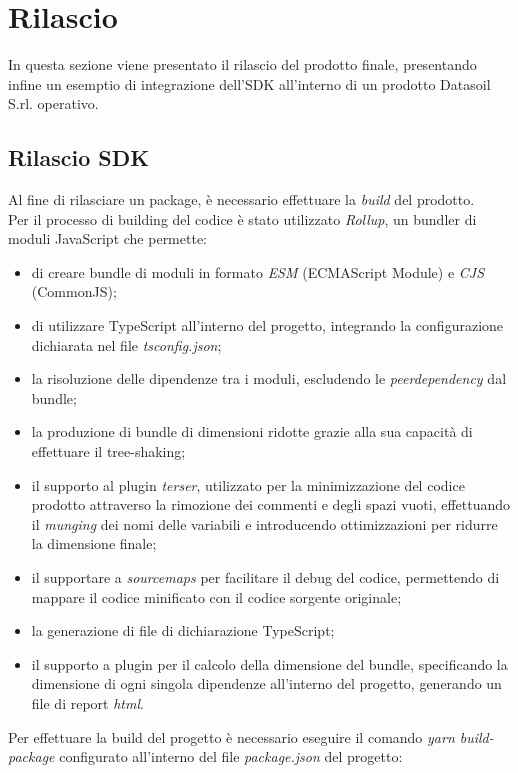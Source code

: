 \chapter{Rilascio}
\label{chap:rilascio}
In questa sezione viene presentato il rilascio del prodotto finale, presentando infine un esemptio di integrazione dell'SDK
all'interno di un prodotto Datasoil S.rl. operativo.

\section{Rilascio SDK}
Al fine di rilasciare un package, è necessario effettuare la \textit{build} del prodotto. \\
Per il processo di building del codice è stato utilizzato \textit{Rollup}, un bundler di moduli JavaScript che permette:
\begin{itemize}
    \item di creare bundle di moduli in formato \textit{ESM} (ECMAScript Module) e \textit{CJS} (CommonJS);
    \item di utilizzare TypeScript all'interno del progetto, integrando la configurazione dichiarata nel file \textit{tsconfig.json};
    \item la risoluzione delle dipendenze tra i moduli, escludendo le \textit{peerdependency} dal bundle;
    \item la produzione di bundle di dimensioni ridotte grazie alla sua capacità di effettuare il tree-shaking;
    \item il supporto al plugin \textit{terser}, utilizzato per la minimizzazione del codice prodotto attraverso la rimozione dei commenti e degli spazi vuoti,
          effettuando il \textit{munging} dei nomi delle variabili e introducendo ottimizzazioni per ridurre la dimensione finale;
    \item il supportare a \textit{sourcemaps} per facilitare il debug del codice, permettendo di mappare il codice minificato con il codice sorgente originale;
    \item la generazione di file di dichiarazione TypeScript;
    \item il supporto a plugin per il calcolo della dimensione del bundle, specificando la dimensione di ogni singola dipendenze
          all'interno del progetto, generando un file di report \textit{html}.
\end{itemize}
Per effettuare la build del progetto è necessario eseguire il comando \textit{yarn build-package} configurato all'interno del file \textit{package.json} del progetto:
